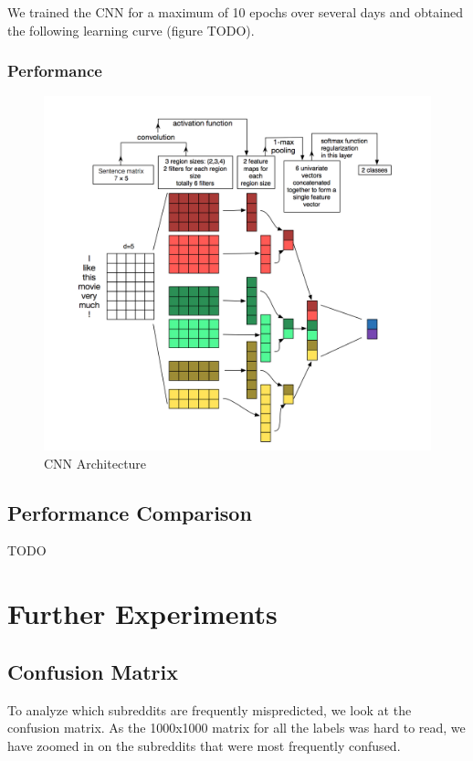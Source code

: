\documentclass{sig-alternate-05-2015}
\begin{document}
We trained the CNN for a maximum of 10 epochs over several days and obtained the following learning curve (figure TODO).

\subsubsection{Performance}
\begin{figure}[H]
\centering
\includegraphics[width=\linewidth]{plots/multi-channel-CNN-architecture.png}
\caption{CNN Architecture}
\end{figure}

\subsection{Performance Comparison}
TODO

\section{Further Experiments}
\subsection{Confusion Matrix}

To analyze which subreddits are frequently mispredicted, we look at the confusion matrix. As the 1000x1000 matrix for all the labels was hard to read, we have zoomed in on the subreddits that were most frequently confused.
\end{document}
